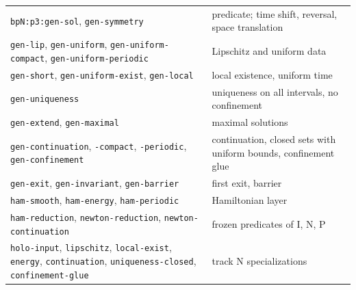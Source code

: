 \begin{center}\small
\begin{tabular}{@{}p{}p{}@{}}
\texttt{bpN:p3:gen-sol}, \texttt{gen-symmetry} & predicate; time shift, reversal, space translation\\
\texttt{gen-lip}, \texttt{gen-uniform}, \texttt{gen-uniform-compact}, \texttt{gen-uniform-periodic} & Lipschitz and uniform data\\
\texttt{gen-short}, \texttt{gen-uniform-exist}, \texttt{gen-local} & local existence, uniform time\\
\texttt{gen-uniqueness} & uniqueness on all intervals, no confinement\\
\texttt{gen-extend}, \texttt{gen-maximal} & maximal solutions\\
\texttt{gen-continuation}, \texttt{-compact}, \texttt{-periodic}, \texttt{gen-confinement} & continuation, closed sets with uniform bounds, confinement glue\\
\texttt{gen-exit}, \texttt{gen-invariant}, \texttt{gen-barrier} & first exit, barrier\\
\texttt{ham-smooth}, \texttt{ham-energy}, \texttt{ham-periodic} & Hamiltonian layer\\
\texttt{ham-reduction}, \texttt{newton-reduction}, \texttt{newton-continuation} & frozen predicates of I, N, P\\
\texttt{holo-input}, \texttt{lipschitz}, \texttt{local-exist}, \texttt{energy}, \texttt{continuation}, \texttt{uniqueness-closed}, \texttt{confinement-glue} & track N specializations\\
\end{tabular}
\end{center}
